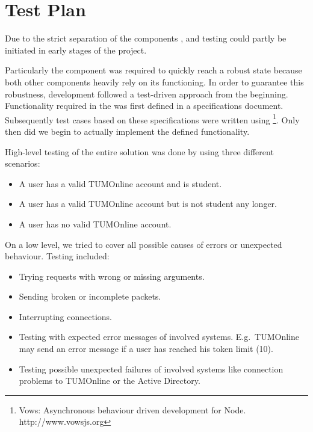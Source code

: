 \section{Test Plan}\label{sec:test_plan}



Due to the strict separation of the components \be, \ph and \ter testing could partly be initiated in early stages of the project.

Particularly the \be component was required to quickly reach a robust state because both other components heavily rely on its functioning.
In order to guarantee this robustness, development followed a test-driven approach from the beginning.
Functionality required in the \be was first defined in a specifications document.
Subsequently test cases based on these specifications were written using \vows\footnote{Vows: Asynchronous behaviour driven development for Node. http://www.vowsjs.org}.
Only then did we begin to actually implement the defined functionality.

\medskip

\noindent
High-level testing of the entire \app solution was done by using three different scenarios:
\begin{itemize}
\item A user has a valid TUMOnline account and is student.
\item A user has a valid TUMOnline account but is not student any longer.
\item A user has no valid TUMOnline account.
\end{itemize}

\noindent
On a low level, we tried to cover all possible causes of errors or unexpected behaviour.
Testing included:
\begin{itemize}
\item Trying requests with wrong or missing arguments.
\item Sending broken or incomplete packets.
\item Interrupting connections.
\item Testing with expected error messages of involved systems.
E.g.~TUMOnline may send an error message if a user has reached his token limit (10).
\item Testing possible unexpected failures of involved systems like connection problems to TUMOnline or the Active Directory.
\end{itemize}


